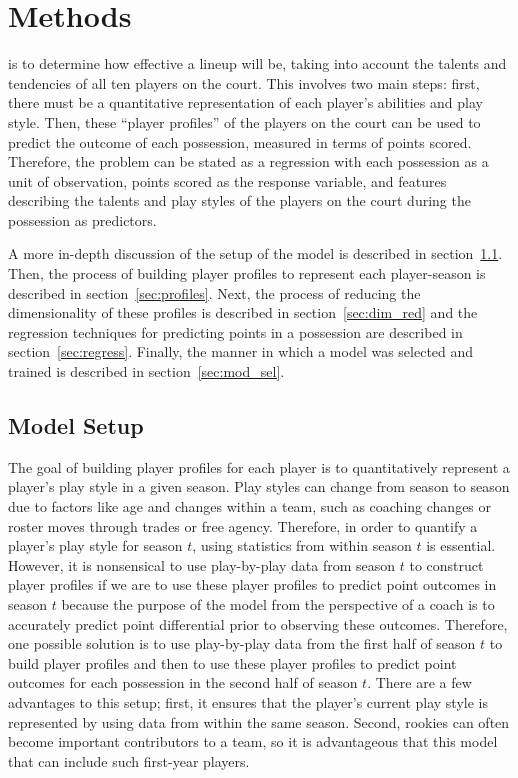 
\chapter{Methods}
\label{ch:methods}

 is to determine how
effective a lineup will be, taking into account the talents and tendencies of all
ten players on the court. This involves two main steps: first, there must be a
quantitative representation of each player's abilities and play style. Then, these
``player profiles'' of the players on the court can be used to predict the outcome
of each possession, measured in terms of points scored. Therefore, the problem can
be stated as a regression with each possession as a unit of observation, points
scored as the response variable, and features describing the talents and play
styles of the players on the court during the possession as predictors.

A more in-depth discussion of the setup of the model is described in
section~\ref{sec:setup}. Then, the process of building player profiles to represent
each player-season is described in section~\ref{sec:profiles}. Next, the process of
reducing the dimensionality of these profiles is described in
section~\ref{sec:dim_red} and the regression techniques for predicting points in a
possession are described in section~\ref{sec:regress}. Finally, the manner in which
a model was selected and trained is described in section~\ref{sec:mod_sel}.

\section{Model Setup}
\label{sec:setup}

The goal of building player profiles for each player is to quantitatively represent
a player's play style in a given season. Play styles can change from season to
season due to factors like age and changes within a team, such as coaching changes
or roster moves through trades or free agency. Therefore, in order to quantify a
player's play style for season $t$, using statistics from within season $t$ is
essential. However, it is nonsensical to use play-by-play data from season $t$ to
construct player profiles if we are to use these player profiles to predict point
outcomes in season $t$ because the purpose of the model from the perspective of a
coach is to accurately predict point differential prior to observing these outcomes.
Therefore, one possible solution is to use play-by-play data from the first half of
season $t$ to build player profiles and then to use these player profiles to predict
point outcomes for each possession in the second half of season $t$. There are a few
advantages to this setup; first, it ensures that the player's current play style is
represented by using data from within the same season. Second, rookies can often
become important contributors to a team, so it is advantageous that this model that
can include such first-year players.

